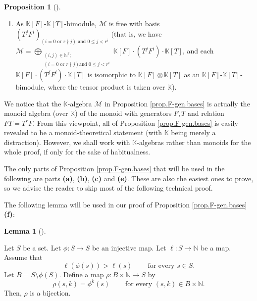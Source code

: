 \documentclass[numbers=enddot,12pt,final,onecolumn,notitlepage]{scrartcl}%
\theoremstyle{definition}
\newtheorem{lem}[theo]{Lemma}
\newenvironment{lemma}[1][]
{\begin{lem}[#1]\begin{leftbar}}
{\end{leftbar}\end{lem}}
\newtheorem{prop}[theo]{Proposition}
\newenvironment{proposition}[1][]
{\begin{prop}[#1]\begin{leftbar}}
{\end{leftbar}\end{prop}}
\begin{document}
\begin{proposition}
\begin{enumerate}
\item[\textbf{(g)}] As $\mathbb{K}\left[  F\right]  $-$\mathbb{K}\left[
T\right]  $-bimodule, $\mathcal{M}$ is free with basis $\left(  T^{j}%
F^{i}\right)  _{\left(  i=0\text{ or }r\nmid j\right)  \text{ and }0\leq
j<r^{i}}$ (that is, we have $\mathcal{M}=\bigoplus\limits_{\substack{\left(
i,j\right)  \in\mathbb{N}^{2};\\\left(  i=0\text{ or }r\nmid j\right)  \text{
and }0\leq j<r^{i}}}\mathbb{K}\left[  F\right]  \cdot\left(  T^{j}%
F^{i}\right)  \cdot\mathbb{K}\left[  T\right]  $, and each $\mathbb{K}\left[
F\right]  \cdot\left(  T^{j}F^{i}\right)  \cdot\mathbb{K}\left[  T\right]  $
is isomorphic to $\mathbb{K}\left[  F\right]  \otimes\mathbb{K}\left[
T\right]  $ as an $\mathbb{K}\left[  F\right]  $-$\mathbb{K}\left[  T\right]
$-bimodule, where the tensor product is taken over $\mathbb{K}$).
\end{enumerate}
\end{proposition}

We notice that the $\mathbb{K}$-algebra $\mathcal{M}$ in Proposition
\ref{prop.F-gen.bases} is actually the monoid algebra (over $\mathbb{K}$) of
the monoid with generators $F,T$ and relation $FT=T^{r}F$. From this
viewpoint, all of Proposition \ref{prop.F-gen.bases} is easily revealed to be
a monoid-theoretical statement (with $\mathbb{K}$ being merely a distraction).
However, we shall work with $\mathbb{K}$-algebras rather than monoids for the
whole proof, if only for the sake of habitualness.

The only parts of Proposition \ref{prop.F-gen.bases} that will be used in the
following are parts \textbf{(a)}, \textbf{(b)}, \textbf{(c)} and \textbf{(e)}.
These are also the easiest ones to prove, so we advise the reader to skip most
of the following technical proof.

The following lemma will be used in our proof of Proposition
\ref{prop.F-gen.bases} \textbf{(f)}:

\begin{lemma}
\label{lem.F-gen.bases.f.1}Let $S$ be a set. Let $\phi:S\rightarrow S$ be an
injective map. Let $\ell:S\rightarrow\mathbb{N}$ be a map. Assume that%
\begin{equation}
\ell\left(  \phi\left(  s\right)  \right)  >\ell\left(  s\right)
\ \ \ \ \ \ \ \ \ \ \text{for every }s\in S.
\label{eq.lem.F-gen.bases.f.1.ass}%
\end{equation}
Let $B=S\setminus\phi\left(  S\right)  $. Define a map $\rho:B\times
\mathbb{N}\rightarrow S$ by%
\[
\rho\left(  s,k\right)  =\phi^{k}\left(  s\right)
\ \ \ \ \ \ \ \ \ \ \text{for every }\left(  s,k\right)  \in B\times
\mathbb{N}.
\]
Then, $\rho$ is a bijection.
\end{lemma}
\end{document}

